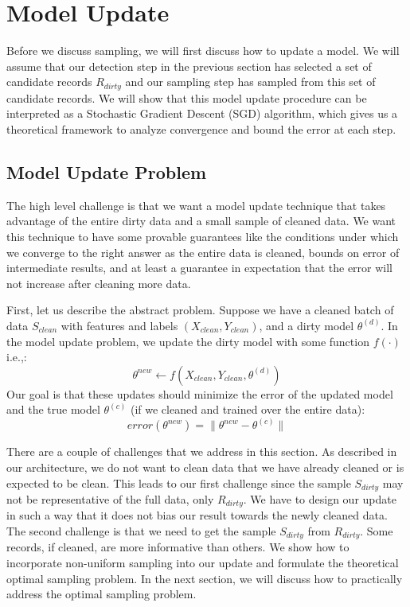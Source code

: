 \section{Model Update}\label{model-update}
Before we discuss sampling, we will first discuss how to update a model.
We will assume that our detection step in the previous section has selected 
a set of candidate records $R_{dirty}$ and our sampling step has sampled from this
set of candidate records.
We will show that this model update procedure can be interpreted as a Stochastic 
Gradient Descent (SGD) algorithm, which gives us a theoretical framework to analyze
convergence and bound the error at each step.

\subsection{Model Update Problem}
The high level challenge is that we want a model update technique that takes advantage of the entire dirty data and a small sample of cleaned data.
We want this technique to have some provable guarantees like the conditions under which we converge to the right answer as the entire data is cleaned, bounds on error of intermediate results, and at least a guarantee in expectation that the error will not increase after cleaning more data.  

First, let us describe the abstract problem.
Suppose we have a cleaned batch of data $S_{clean}$ with features and labels $(X_{clean},Y_{clean})$, and a dirty model $\theta^{(d)}$. 
In the model update problem, we update the dirty model with some function $f(\cdot)$ i.e.,:
\[
\theta^{new} \leftarrow f(X_{clean},Y_{clean},\theta^{(d)})
\]
Our goal is that these updates should minimize the error of the updated model and the true model $\theta^{(c)}$ (if we cleaned and trained over the entire data):
\[
error(\theta^{new}) = \| \theta^{new} - \theta^{(c)} \|
\]

There are a couple of challenges that we address in this section.
As described in our architecture, we do not want to clean data that we have already cleaned or is expected to be clean.
This leads to our first challenge since the sample $S_{dirty}$ may not be representative of the full data, only $R_{dirty}$. 
We have to design our update in such a way that it does not bias our result towards the newly cleaned data. 
The second challenge is that we need to get the sample $S_{dirty}$ from $R_{dirty}$.
Some records, if cleaned, are more informative than others.
We show how to incorporate non-uniform sampling into our update and formulate the theoretical optimal sampling problem.
In the next section, we will discuss how to practically address the optimal sampling problem.

